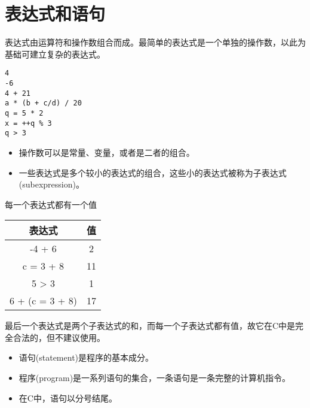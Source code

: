 \section{表达式和语句}

\begin{frame}[fragile]
\begin{dingyi}
  \textcolor{acolor3}{表达式}由运算符和操作数组合而成。最简单的表达式是一个单独的操作数，以此为基础可建立复杂的表达式。
\end{dingyi}
\begin{lstlisting}[backgroundcolor=\color{red!10}]
4
-6
4 + 21
a * (b + c/d) / 20
q = 5 * 2
x = ++q % 3
q > 3
\end{lstlisting}
\end{frame}

\begin{frame}[fragile]
\begin{itemize}
\item 操作数可以是常量、变量，或者是二者的组合。\\[0.15in]
\item 一些表达式是多个较小的表达式的组合，这些小的表达式被称为子表达式(subexpression)。
\end{itemize}
\end{frame}

\begin{frame}[fragile]
\textcolor{acolor3}{每一个表达式都有一个值}

\begin{table}
\centering
\begin{tabular}{c|c} \hline
表达式 & 值 \\ \hline \hline
-4 + 6 & 2\\\hline
c = 3 + 8 & 11 \\ \hline
5 > 3 & 1 \\ \hline
6 + (c = 3 + 8) & 17 \\ \hline
\end{tabular}
\end{table}
最后一个表达式是两个子表达式的和，而每一个子表达式都有值，故它在C中是完全合法的，但不建议使用。

\end{frame}

\begin{frame}[fragile]
\begin{itemize}
\item 
  语句(statement)是程序的基本成分。\\[0.15in]
\item
  程序(program)是一系列语句的集合，一条语句是一条完整的计算机指令。\\[0.15in]
\item
\textcolor{acolor3}{在C中，语句以分号结尾。}
\end{itemize}

\end{frame}

